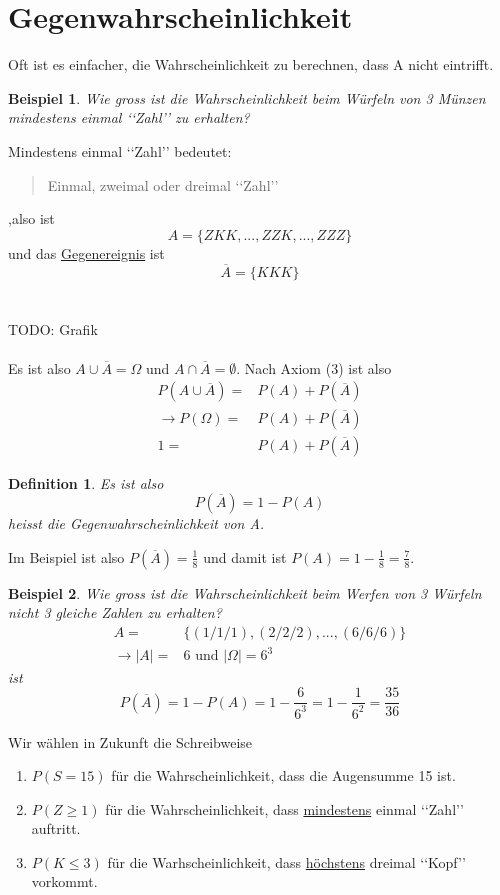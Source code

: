 \documentclass{report}
\newtheorem{mydef}{Definition}
\newtheorem{myexample}{Beispiel}
\begin{document}
\section{Gegenwahrscheinlichkeit}
Oft ist es einfacher, die Wahrscheinlichkeit zu berechnen, dass A nicht eintrifft.
\begin{myexample}
Wie gross ist die Wahrscheinlichkeit beim Würfeln von 3 Münzen mindestens einmal \lq\lq{}Zahl\rq\rq{} zu erhalten?
\end{myexample}
Mindestens einmal \lq\lq{}Zahl\rq\rq{} bedeutet:
\begin{quote}
Einmal, zweimal oder dreimal \lq\lq{}Zahl\rq\rq{}
\end{quote}
,also ist
\begin{equation}
A = \{ZKK, ..., ZZK, ..., ZZZ \}
\end{equation}
und das \underline{Gegenereignis} ist
\begin{equation}
\overline{A} = \{KKK\}
\end{equation}
\\\\TODO: Grafik\\\\
Es ist also $A \cup \overline{A} = \Omega$ und $A \cap \overline{A} = \emptyset$. Nach Axiom (3) ist also
\begin{align*}
 P(A \cup \overline{A}) =& P(A) + P(\overline{A})\\
 \longrightarrow P(\Omega) =& P(A) + P(\overline{A})\\
 1 =& P(A) + P(\overline{A})
\end{align*}
\begin{mydef}
Es ist also
\begin{equation}
P(\overline{A}) = 1 - P(A)
\end{equation}
heisst die Gegenwahrscheinlichkeit von A.
\end{mydef}
Im Beispiel ist also $P(\overline{A}) = \frac{1}{8}$ und damit ist $P(A) = 1 - \frac{1}{8} = \frac{7}{8}$.
\begin{myexample}
Wie gross ist die Wahrscheinlichkeit beim Werfen von 3 Würfeln nicht 3 gleiche Zahlen zu erhalten?
\begin{align*}
A =& \{(1/1/1),(2/2/2), ..., (6/6/6)\}\\
\longrightarrow |A| =& 6 \mbox{ und } |\Omega| = 6^3
\end{align*}
ist
\begin{equation}
P(\overline{A}) = 1 - P(A) = 1 - \frac{6}{6^3} = 1 - \frac{1}{6^2} = \frac{35}{36}
\end{equation}
\end{myexample}
Wir wählen in Zukunft die Schreibweise
\begin{enumerate}
\item
$P(S=15)$ für die Wahrscheinlichkeit, dass die Augensumme 15 ist.
\item
$P(Z\geq1)$ für die Wahrscheinlichkeit, dass \underline{mindestens} einmal \lq\lq{}Zahl\rq\rq{} auftritt.
\item
$P(K\leq3)$ für die Warhscheinlichkeit, dass \underline{höchstens} dreimal \lq\lq{}Kopf\rq\rq{} vorkommt.
\end{enumerate}
\end{document}
